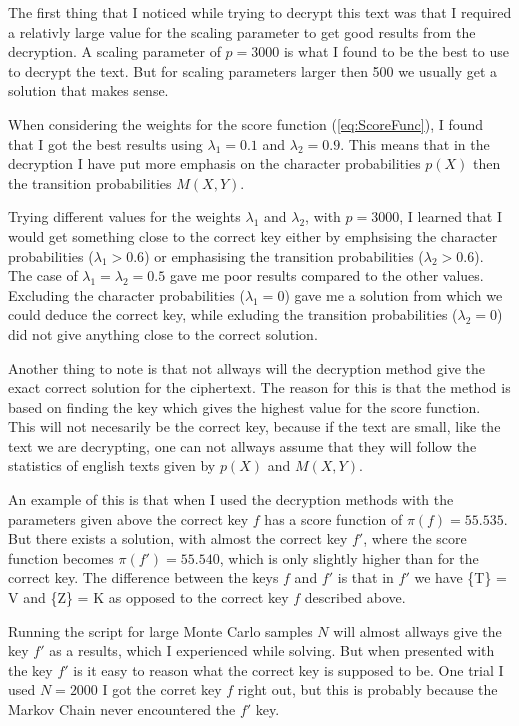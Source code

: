\documentclass[a4paper, 11pt]{article}
\begin{document}
The first thing that I noticed while trying to decrypt this text was that I
required a relativly large value for the scaling parameter to get good results
from the decryption. A scaling parameter of $p = 3000$ is what I found to
be the best to use to decrypt the text. But for scaling parameters larger then
500 we usually get a solution that makes sense.

When considering the weights for the score function (\ref{eq:ScoreFunc}), I 
found that I got the best results using $\lambda_1 = 0.1$ and 
$\lambda_2 = 0.9$. This means that in the decryption I have put more emphasis 
on the character probabilities $p(X)$ then the transition probabilities 
$M(X,Y)$.

Trying different values for the weights $\lambda_1$ and $\lambda_2$,
with $p = 3000$, I learned that I would get something
close to the correct key either by emphsising the character probabilities
($\lambda_1 > 0.6$) or emphasising the transition probabilities 
($\lambda_2 > 0.6$). The case of $\lambda_1 = \lambda_2 = 0.5$ gave me 
poor results compared to the other values. Excluding the character
probabilities ($\lambda_1 = 0$) gave me a solution from which we could
deduce the correct key, while exluding the transition probabilities
($\lambda_2 = 0$) did not give anything close to the correct solution.

Another thing to note is that not allways will the decryption method give
the exact correct solution for the ciphertext. The reason for this is that
the method is based on finding the key which gives the highest value for 
the score function. This will not necesarily be the correct key, because 
if the text are small, like the text we are decrypting, one can not allways
assume that they will follow the statistics of english texts given by
$p(X)$ and $M(X,Y)$.

An example of this is that when I used the decryption methods with the
parameters given above the correct key $f$ has a score function of 
$\pi(f) = 55.535$. But there exists a solution, with almost the correct
key $f'$, where the score function becomes $\pi(f') = 55.540$, which is only
slightly higher than for the correct key. The difference between the keys
$f$ and $f'$ is that in $f'$ we have \{T\} = V and \{Z\} = K as opposed to
the correct key $f$ described above.

Running the script for large Monte Carlo samples $N$ will almost allways give
the key $f'$ as a results, which I experienced while solving. But when 
presented with the key $f'$ is it easy to reason what the correct key
is supposed to be. One trial I used $N = 2000$ I got the corret key $f$ right 
out, but this is probably because the Markov Chain never encountered the $f'$
key.
\end{document}
